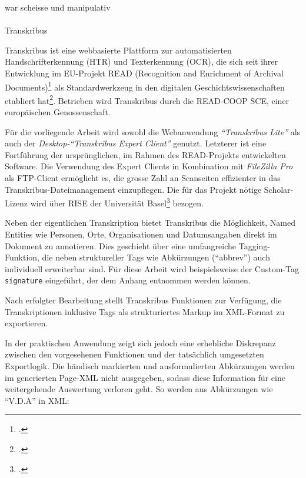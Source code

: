 \documentclass[12pt, a4paper, ngerman, bidi=default]{article}
\makeatletter
\let\cite\footcite
\let\oldparagraph\paragraph%
\renewcommand{\paragraph}{
    \@ifstar%
      \xxxParagraphStar%
      \xxxParagraphNoStar%
 }
\newcommand{\xxxParagraphStar}[1]{\oldparagraph*{#1}\mbox{}}
\newcommand{\xxxParagraphNoStar}[1]{\oldparagraph{#1}\mbox{}}
\makeatother
\begin{document}
war scheisse und manipulativ

\paragraph{Transkribus}

Transkribus ist eine webbasierte Plattform zur automatisierten Handschrifterkennung (HTR) und Texterkennung (OCR), die sich seit ihrer Entwicklung im EU-Projekt READ 
(Recognition and Enrichment of Archival Documents)\cite[vgl.][]{noauthor_recognition_nodate} als Standardwerkzeug in den digitalen Geschichtswissenschaften etabliert 
hat\cite[vgl.][postnote]{muhlberger_transkribus_2019}. Betrieben wird Transkribus durch die READ-COOP SCE, einer europäischen Genossenschaft.

Für die vorliegende Arbeit wird sowohl die Webanwendung \textit{\enquote{Transkribus Lite}} als auch der \textit{Desktop-\enquote{Transkribus Expert Client}} genutzt. 
Letzterer ist eine Fortführung der ursprünglichen, im Rahmen des READ-Projekts entwickelten Software. Die Verwendung des Expert Clients in Kombination mit \textit{FileZilla Pro} 
als FTP-Client ermöglicht es, die grosse Zahl an Scanseiten effizienter in das Transkribus-Dateimanagement einzupflegen. Die für das Projekt nötige Scholar-Lizenz wird über 
RISE der Universität Basel\cite[weitere Informationen:][postnote]{decker_home_nodate} bezogen.

Neben der eigentlichen Transkription bietet Transkribus die Möglichkeit, Named Entities wie Personen, Orte, Organisationen und Datumsangaben direkt im Dokument zu annotieren. 
Dies geschieht über eine umfangreiche Tagging-Funktion, die neben struktureller Tags wie Abkürzungen (\enquote{abbrev}) auch individuell erweiterbar sind. Für diese Arbeit wird 
beispielsweise der Custom-Tag \colorbox{signature}{\texttt{signature}} eingeführt, der dem Anhang entnommen werden können.

Nach erfolgter Bearbeitung stellt Transkribus Funktionen zur Verfügung, die Transkriptionen inklusive Tags als strukturiertes Markup im XML-Format zu exportieren.

In der praktischen Anwendung zeigt sich jedoch eine erhebliche Diskrepanz zwischen den vorgesehenen Funktionen und der tatsächlich umgesetzten Exportlogik. 
Die händisch markierten und ausformulierten Abkürzungen werden im generierten Page-XML nicht ausgegeben, sodass diese Information 
für eine weitergehende Auswertung verloren geht. So werden aus Abkürzungen wie \enquote{V.D.A} in XML:
\end{document}
